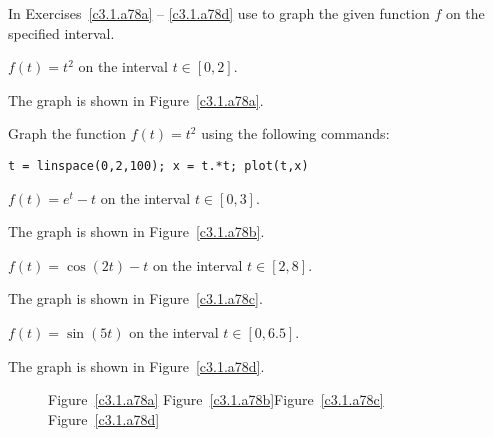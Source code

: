 \documentclass{ximera}
\begin{document}
\CEXER

\noindent In Exercises~\ref{c3.1.a78a} -- \ref{c3.1.a78d} use \Matlab
to graph the given function $f$ on the specified interval.
\begin{exercise} \label{c3.1.a78a}
$f(t) = t^2$ on the interval $t\in [0,2]$.

\begin{solution}

\ans The graph is shown in Figure~\ref{c3.1.a78a}.

\soln Graph the function $f(t) = t^2$ using the following \Matlab commands:
\begin{verbatim}
t = linspace(0,2,100); x = t.*t; plot(t,x)
\end{verbatim}

\end{solution}
\end{exercise}
\begin{exercise} \label{c3.1.a78b}
$f(t) = e^t-t$ on the interval $t\in [0,3]$.

\begin{solution}
The graph is shown in Figure~\ref{c3.1.a78b}.

\end{solution}
\end{exercise}
\begin{exercise} \label{c3.1.a78c}
$f(t) = \cos(2t)-t$ on the interval $t\in [2,8]$.

\begin{solution}
The graph is shown in Figure~\ref{c3.1.a78c}.

\end{solution}
\end{exercise}
\begin{exercise} \label{c3.1.a78d}
$f(t) = \sin(5t)$ on the interval $t\in [0,6.5]$.

\begin{solution}
The graph is shown in Figure~\ref{c3.1.a78d}.

\begin{figure}[htb]
                       \centerline{%
                       }
	\centerline{Figure~\ref{c3.1.a78a}\hspace{0.8in}
	Figure~\ref{c3.1.a78b}\hspace{0.8in}Figure~\ref{c3.1.a78c}
	\hspace{0.8in}Figure~\ref{c3.1.a78d}}
\end{figure}

\end{solution}
\end{exercise}
\end{document}
